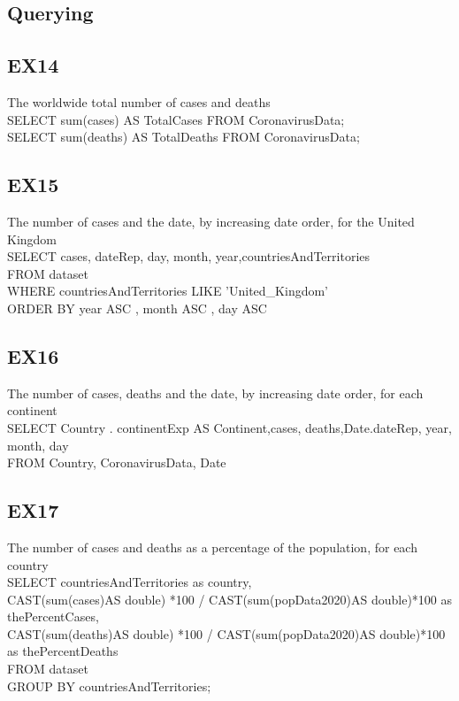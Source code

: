 \documentclass[]{article}
\begin{document}
\begin{titlepage}
		\section{Querying}
		    \subsection{EX14}
		    The worldwide total number of cases and deaths\\
		    SELECT sum(cases)  AS TotalCases FROM CoronavirusData;\\
            SELECT sum(deaths) AS TotalDeaths FROM CoronavirusData;\\

		    \subsection{EX15}
		    The number of cases and the date, by increasing date order, for the United Kingdom\\
            SELECT cases, dateRep, day, month, year,countriesAndTerritories\\
            FROM dataset\\
            WHERE countriesAndTerritories LIKE 'United_Kingdom'\\
            ORDER BY year ASC , month ASC , day ASC\\
            
		    \subsection{EX16}
		    The number of cases, deaths and the date, by increasing date order, for each continent\\
            SELECT Country . continentExp AS Continent,cases, deaths,Date.dateRep, year, month, day\\
            FROM Country, CoronavirusData, Date\\

		    \subsection{EX17}
		    The number of cases and deaths as a percentage of the population, for each country\\
            SELECT countriesAndTerritories as country,\\
            CAST(sum(cases)AS double) *100 / CAST(sum(popData2020)AS double)*100  as thePercentCases,\\
            CAST(sum(deaths)AS double) *100 / CAST(sum(popData2020)AS double)*100 as thePercentDeaths\\
            FROM dataset\\
            GROUP BY countriesAndTerritories;\\
            

\end{titlepage}
\end{document}
